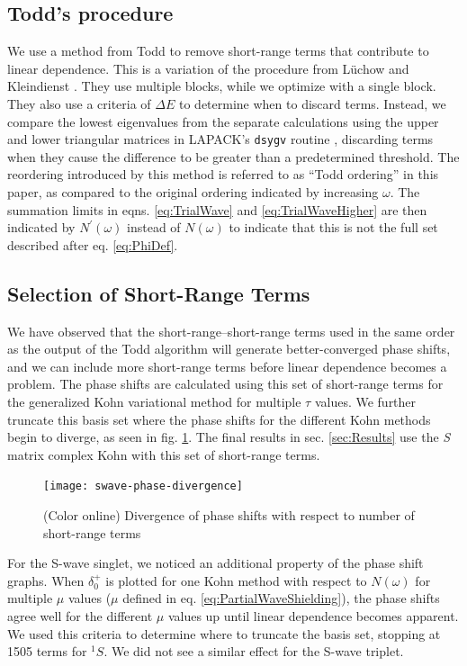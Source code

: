\documentclass[preprint,showpacs,preprintnumbers,amsmath,amssymb]{revtex4}
\begin{document}
\subsection{Todd's procedure}
\label{sec:Todd}
We use a method from Todd \cite{Todd2007} to remove short-range terms that contribute to linear dependence. This is a variation of the procedure from L\"uchow and Kleindienst \cite{Luchow1992}. They use multiple blocks, while we optimize with a single block. They also use a criteria of $\Delta E$ to determine when to discard terms. Instead, we compare the lowest eigenvalues from the separate calculations using the upper and lower triangular matrices in LAPACK's \texttt{dsygv} routine \cite{LAPACK}, discarding terms when they cause the difference to be greater than a predetermined threshold. The reordering introduced by this method is referred to as ``Todd ordering'' in this paper, as compared to the original ordering indicated by increasing $\omega$. The summation limits in eqns. \ref{eq:TrialWave} and \ref{eq:TrialWaveHigher} are then indicated by $N^\prime(\omega)$ instead of $N(\omega)$ to indicate that this is not the full set described after eq. \ref{eq:PhiDef}.


\subsection{Selection of Short-Range Terms}
\label{sec:Truncation}
We have observed that the short-range--short-range terms used in the same order as the output of the Todd algorithm will generate better-converged phase shifts, and we can include more short-range terms before linear dependence becomes a problem. The phase shifts are calculated using this set of short-range terms for the generalized Kohn variational method for multiple $\tau$ values. We further truncate this basis set where the phase shifts for the different Kohn methods begin to diverge, as seen in fig. \ref{fig:swave-phase-divergence}. The final results in sec. \ref{sec:Results} use the \emph{S} matrix complex Kohn with this set of short-range terms.

\begin{figure}[H]
	\centering
	\texttt{[image: swave-phase-divergence]}
	\caption{(Color online) Divergence of phase shifts with respect to number of short-range terms}
	\label{fig:swave-phase-divergence}
\end{figure}

For the S-wave singlet, we noticed an additional property of the phase shift graphs. When $\delta_0^+$ is plotted for one Kohn method with respect to $N(\omega)$ for multiple $\mu$ values ($\mu$ defined in eq. \ref{eq:PartialWaveShielding}), the phase shifts agree well for the different $\mu$ values up until linear dependence becomes apparent. We used this criteria to determine where to truncate the basis set, stopping at 1505 terms for $^1S$. We did not see a similar effect for the S-wave triplet.
\end{document}
